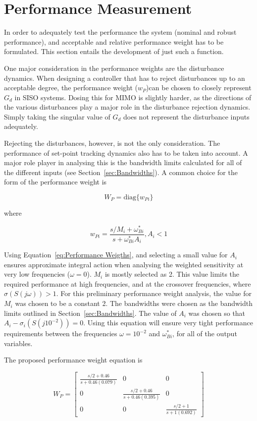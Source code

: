 \section{Performance Measurement}
\label{sec:Performance Measurement}
In order to adequately test the performance the system (nominal and robust performance), and acceptable and relative performance weight has to be formulated. This section entails the development of just such a function. 

One major consideration in the performance weights are the disturbance dynamics. When designing a controller that has to reject disturbances up to an acceptable degree, the performance weight ($w_P$)can be chosen to closely represent $G_d$ in SISO systems. Dosing this for MIMO is slightly harder, as the directions of the various disturbances play a major role in the disturbance rejection dynamics. Simply taking the singular value of $G_d$ does not represent the disturbance inputs adequately.

Rejecting the disturbances, however, is not the only consideration. The performance of set-point tracking dynamics also has to be taken into account. A major role player in analysing this is the bandwidth limits calculated for all of the different inputs (see Section~\ref{sec:Bandwidths}). A common choice for the form of the performance weight is 

\begin{equation}
	W_P = \textrm{diag}\{w_{Pi}\}
\end{equation}

where

\begin{equation}
	\label{eq:Performance Weigths}
	w_{Pi} = \frac{s/M_i + \omega^*_{Bi}}{s + \omega^*_{Bi}A_i} , A_i < 1
\end{equation}

Using Equation~\ref{eq:Performance Weigths}, and selecting a small value for $A_i$ ensures approximate integral action when analysing the weighted sensitivity at very low frequencies ($\omega = 0$). $M_i$ is mostly selected as 2. This value limits the required performance at high frequencies, and at the crossover frequencies, where $\sigma(S(j\omega))>1$. For this preliminary performance weight analysis, the value for $M_i$ was chosen to be a constant 2. The bandwidths were chosen as the bandwidth limits outlined in Section~\ref{sec:Bandwidths}. The value of $A_i$ was chosen so that $A_i - \sigma_i(S(j10^{-2})) = 0$. Using this equation will ensure very tight performance requirements between the frequencies $\omega = 10^{-2}$ and $\omega^*_{Bi}$, for all of the output variables. 

The proposed performance weight equation is

\begin{equation}
	W_P = \begin{bmatrix}
	\frac{s/2 + 0.46}{s+ 0.46(0.079)} & 0 & 0\\
	0 & \frac{s/2 + 0.46}{s+ 0.46(0.395)} & 0\\
	0 & 0 & \frac{s/2 + 1}{s+ 1(0.692)}
	\end{bmatrix}
\end{equation}